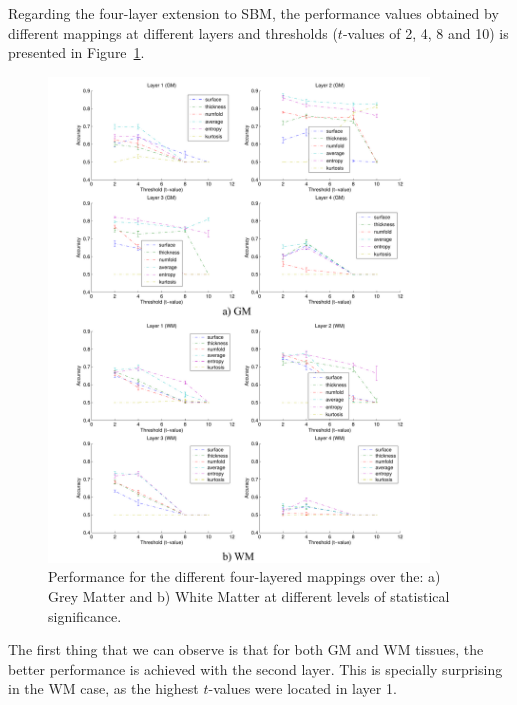 Regarding the four-layer extension to \ac{SBM}, the performance values obtained by different mappings at different layers and thresholds ($t$-values of 2, 4, 8 and 10) is presented in Figure~\ref{fig:layeredPerf}. 

\begin{figure}[htp]
	\centering
	\includegraphics[width=0.9\textwidth]{Graphics/ch6/11-layerPerf}
	\caption{Performance for the different four-layered mappings over the: a) Grey Matter and b) White Matter at different levels of statistical significance.}
	\label{fig:layeredPerf}
\end{figure}

The first thing that we can observe is that for both \ac{GM} and \ac{WM} tissues, the better performance is achieved with the second layer. This is specially surprising in the \ac{WM} case, as the highest $t$-values were located in layer 1. 

